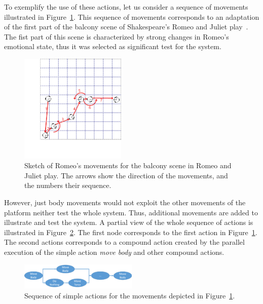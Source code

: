 To exemplify the use of these actions, let us consider a sequence of movements illustrated in Figure~\ref{fig:triskar_test}. This sequence of movements corresponds to an adaptation of the first part of the balcony scene of Shakespeare's Romeo and Juliet play~\cite{RAndJ}. The fist part of this scene is characterized by strong changes in Romeo's emotional state, thus it was selected as significant test for the system.  
\begin{figure}
	\centering
	\includegraphics[width=0.45\textwidth]{./Images/FourthCaseSceneB.png}
	\caption{Sketch of Romeo's movements for the balcony scene in Romeo and Juliet play. The arrows show the direction of the movements, and the numbers their sequence.}
	\label{fig:triskar_test}
\end{figure} 
However, just body movements would not exploit the other movements of the platform neither test the whole system. Thus, additional movements are added to illustrate and test the system. A partial view of the whole sequence of actions is illustrated in Figure~\ref{fig:sequence_actions}. The first node corresponds to the first action in Figure~\ref{fig:triskar_test}. The second actions corresponds to a compound action created by the parallel execution of the simple action \textit{move body} and other compound actions.

\begin{figure}
	\centering
	\includegraphics[width=0.5\textwidth]{./Images/sequenceActions.png}
	\caption{Sequence of simple actions for the movements depicted in Figure~\ref{fig:triskar_test}.}
	\label{fig:sequence_actions}
\end{figure}